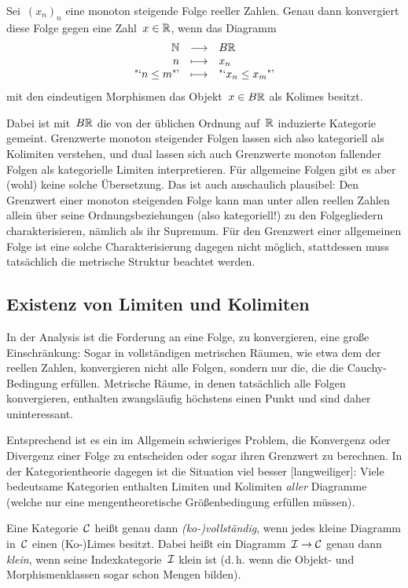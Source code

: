 \begin{prop}Sei~$(x_n)_n$ eine monoton steigende Folge reeller Zahlen. Genau dann
konvergiert diese Folge gegen eine Zahl~$x \in \mathbb{R}$, wenn das Diagramm
\[ \begin{array}{@{}rcl@{}}
  \NN &\longrightarrow& B\RR \\
  n &\longmapsto& x_n \\
  \text{"`$n \leq m$"'} &\longmapsto& \text{"`$x_n \leq x_m$"'}
\end{array} \]
mit den eindeutigen Morphismen das Objekt~$x \in B\mathbb{R}$ als Kolimes besitzt.
\end{prop}
Dabei ist mit~$B\mathbb{R}$ die von der üblichen Ordnung auf~$\mathbb{R}$ induzierte
Kategorie gemeint. Grenzwerte monoton steigender Folgen lassen sich also
kategoriell als Kolimiten verstehen, und dual lassen sich auch Grenzwerte
monoton fallender Folgen als kategorielle Limiten interpretieren. Für
allgemeine Folgen gibt es aber (wohl) keine solche Übersetzung. Das ist auch
anschaulich plausibel: Den Grenzwert einer monoton steigenden Folge kann man
unter allen reellen Zahlen allein über seine Ordnungsbeziehungen (also kategoriell!) zu
den Folgegliedern charakterisieren, nämlich als ihr Supremum. Für den Grenzwert
einer allgemeinen Folge ist eine solche Charakterisierung dagegen nicht
möglich, stattdessen muss tatsächlich die metrische Struktur beachtet werden.


\subsection{Existenz von Limiten und Kolimiten}

In der Analysis ist die Forderung an eine Folge, zu konvergieren, eine große
Einschränkung: Sogar in vollständigen metrischen Räumen, wie etwa dem der
reellen Zahlen, konvergieren nicht alle Folgen, sondern nur die, die die
Cauchy-Bedingung erfüllen. Metrische Räume, in denen tatsächlich alle Folgen
konvergieren, enthalten zwangsläufig höchstens einen Punkt und sind daher
uninteressant.

Entsprechend ist es ein im Allgemein schwieriges Problem, die Konvergenz oder
Divergenz einer Folge zu entscheiden oder sogar ihren Grenzwert zu berechnen.
In der Kategorientheorie dagegen ist die Situation viel besser [langweiliger]: Viele
bedeutsame Kategorien enthalten Limiten und Kolimiten \emph{aller} Diagramme
(welche nur eine mengentheoretische Größenbedingung erfüllen müssen).

\begin{defn}Eine Kategorie~$\mathcal{C}$ heißt genau dann \emph{(ko-)vollständig}, wenn
jedes kleine Diagramm in~$\mathcal{C}$ einen (Ko-)Limes besitzt. Dabei heißt ein
Diagramm~$\mathcal{I} \to \mathcal{C}$ genau dann \emph{klein}, wenn seine Indexkategorie~$\mathcal{I}$
klein ist (d.\,h. wenn die Objekt- und Morphismenklassen sogar schon Mengen
bilden).\end{defn}

